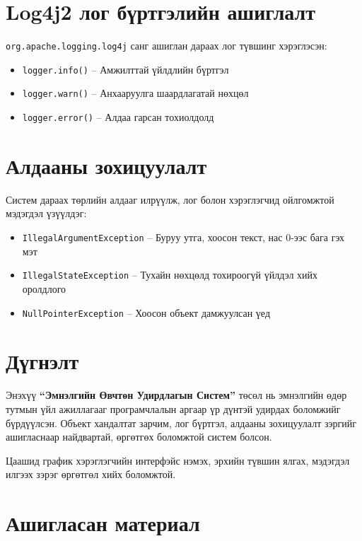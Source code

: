 \documentclass[12pt]{article}
\begin{document}
\section*{Log4j2 лог бүртгэлийн ашиглалт}

\texttt{org.apache.logging.log4j} санг ашиглан дараах лог түвшинг хэрэглэсэн:

\begin{itemize}
    \item \texttt{logger.info()} – Амжилттай үйлдлийн бүртгэл
    \item \texttt{logger.warn()} – Анхааруулга шаардлагатай нөхцөл
    \item \texttt{logger.error()} – Алдаа гарсан тохиолдолд
\end{itemize}

\section*{Алдааны зохицуулалт}

Систем дараах төрлийн алдааг илрүүлж, лог болон хэрэглэгчид ойлгомжтой мэдэгдэл үзүүлдэг:

\begin{itemize}
    \item \texttt{IllegalArgumentException} – Буруу утга, хоосон текст, нас 0-ээс бага гэх мэт
    \item \texttt{IllegalStateException} – Тухайн нөхцөлд тохироогүй үйлдэл хийх оролдлого
    \item \texttt{NullPointerException} – Хоосон объект дамжуулсан үед
\end{itemize}

\section*{Дүгнэлт}

Энэхүү \textbf{“Эмнэлгийн Өвчтөн Удирдлагын Систем”} төсөл нь эмнэлгийн өдөр тутмын үйл ажиллагааг програмчлалын аргаар үр дүнтэй удирдах боломжийг бүрдүүлсэн. Объект хандалтат зарчим, лог бүртгэл, алдааны зохицуулалт зэргийг ашигласнаар найдвартай, өргөтгөх боломжтой систем болсон.

Цаашид график хэрэглэгчийн интерфэйс нэмэх, эрхийн түвшин ялгах, мэдэгдэл илгээх зэрэг өргөтгөл хийх боломжтой.

\section*{Ашигласан материал}
\end{document}
